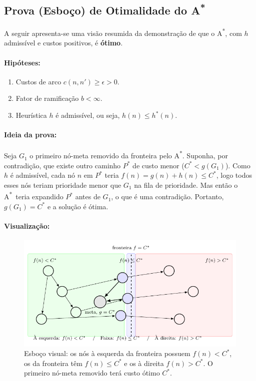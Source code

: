 \documentclass[9pt,a4paper]{extarticle}
\newcommand{\Astar}{A\textsuperscript{*}}
\begin{document}
\subsection*{Prova (Esboço) de Otimalidade do \Astar}

A seguir apresenta-se uma visão resumida da demonstração de que o \Astar,
com $h$ admissível e custos positivos, é \textbf{ótimo}.

\paragraph{Hipóteses:}
\begin{enumerate}
  \item Custos de arco $c(n,n') \ge \epsilon > 0$.
  \item Fator de ramificação $b < \infty$.
  \item Heurística $h$ é admissível, ou seja, $h(n) \le h^*(n)$.
\end{enumerate}

\paragraph{Ideia da prova:}
Seja $G_1$ o primeiro nó-meta removido da fronteira pelo \Astar.
Suponha, por contradição, que existe outro caminho $P^*$ de custo menor ($C^* < g(G_1)$).
Como $h$ é admissível,
cada nó $n$ em $P^*$ teria $f(n) = g(n)+h(n) \le C^*$,
logo todos esses nós teriam prioridade menor que $G_1$ na fila de prioridade.
Mas então o \Astar\ teria expandido $P^*$ antes de $G_1$, o que é uma contradição.
Portanto, $g(G_1)=C^*$ e a solução é ótima.

\paragraph{Visualização:}
\begin{figure}[H]
  \centering
  \includegraphics[width=.7\linewidth]{figure1.pdf}
  \caption{Esboço visual: os nós à esquerda da fronteira possuem $f(n) < C^*$,
  os da fronteira têm $f(n) \le C^*$ e os à direita $f(n) > C^*$.
  O primeiro nó-meta removido terá custo ótimo $C^*$.}
\end{figure}
\end{document}
